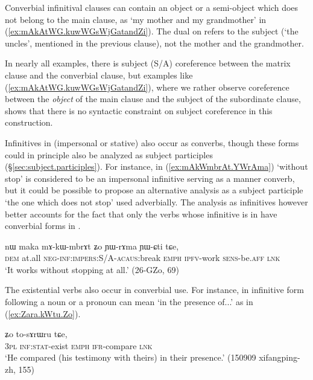 Converbial infinitival clauses can contain an object or a semi-object which does not belong to the main clause, as  `my mother and my grandmother' in (\ref{ex:mAkAtWG.kuwWGsWjGatandZi}). The dual on  refers to the subject (`the uncles', mentioned in the previous clause), not the mother and the grandmother.

In nearly all examples, there is subject (S/A) coreference between the matrix clause and the converbial clause, but examples like (\ref{ex:mAkAtWG.kuwWGsWjGatandZi}), where we rather observe coreference between the \textit{object} of the main clause and the subject of the subordinate clause, shows that there is no syntactic constraint on subject coreference in this construction.

Infinitives in  (impersonal or stative) also occur as converbs, though these forms could in principle also be analyzed as subject participles (§\ref{sec:subject.participles}). For instance, in (\ref{ex:mAkWmbrAt.YWrAma})  `without stop' is considered to be an impersonal infinitive serving as a manner converb, but it could be possible to propose an alternative analysis as a  subject participle `the one which does not stop' used adverbially.  The analysis as infinitives however better accounts for the fact that only the verbs whose infinitive is in  have converbial forms in .

\begin{exe}
\ex \label{ex:mAkWmbrAt.YWrAma}
 \gll nɯ maka mɤ-kɯ-mbrɤt ʑo ɲɯ-rɤma ɲɯ-ɕti tɕe,  \\
 \textsc{dem} at.all  \textsc{neg}-\textsc{inf}:\textsc{impers}:S/A-\textsc{acaus}:break \textsc{emph} \textsc{ipfv}-work \textsc{sens}-be.\textsc{aff} \textsc{lnk} \\
 \glt `It works without stopping at all.' (26-GZo, 69)
\end{exe}

The existential verbs also occur in converbial use. For instance,  in infinitive form  following a noun or a pronoun can mean `in the presence of...' as in (\ref{ex:Zara.kWtu.Zo}).

\begin{exe}
\ex \label{ex:Zara.kWtu.Zo}
\gll [ʑara kɯ-tu] ʑo to-sɤrɯru tɕe, \\
\textsc{3pl} \textsc{inf}:\textsc{stat}-exist \textsc{emph} \textsc{ifr}-compare \textsc{lnk} \\
\glt `He compared (his testimony with theirs) in their presence.' (150909 xifangping-zh, 155)
\end{exe}

